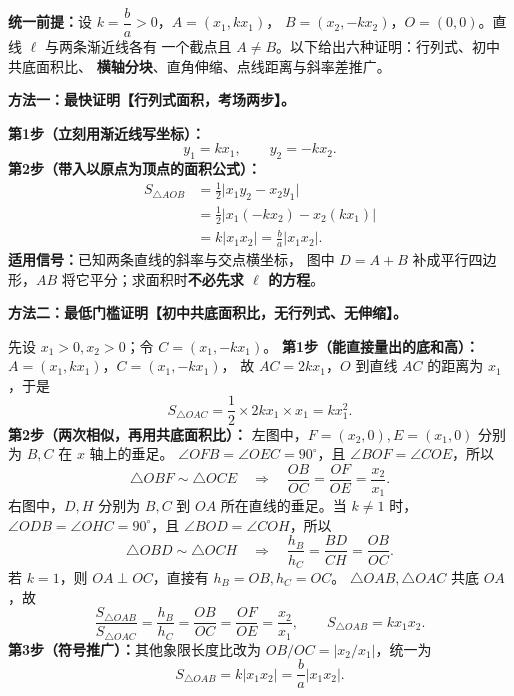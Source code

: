 \clearpage
\begin{proofbox}
\textbf{统一前提：}设 $k=\dfrac ba>0$，$A=(x_1,kx_1)$，
$B=(x_2,-kx_2)$，$O=(0,0)$。直线 $\ell$ 与两条渐近线各有
一个截点且 $A\ne B$。以下给出六种证明：行列式、初中共底面积比、
\textbf{横轴分块}、直角伸缩、点线距离与斜率差推广。

\medskip
\textbf{方法一：最快证明【行列式面积，考场两步】。}
\begin{center}\end{center}


\textbf{第1步（立刻用渐近线写坐标）：}
\[
 y_1=kx_1,\qquad y_2=-kx_2.
\]
\textbf{第2步（带入以原点为顶点的面积公式）：}
\[
\begin{aligned}
S_{\triangle AOB}
&=\frac12\big|x_1y_2-x_2y_1\big|\\
&=\frac12\big|x_1(-kx_2)-x_2(kx_1)\big|\\
&=\boxed{k|x_1x_2|=\frac ba|x_1x_2|}.
\end{aligned}
\]
\textbf{适用信号：}已知两条直线的斜率与交点横坐标，
图中 $D=A+B$ 补成平行四边形，$AB$ 将它平分；求面积时\textbf{不必先求 $\ell$ 的方程}。

\medskip

\end{proofbox}
\clearpage
\begin{proofbox}
\textbf{方法二：最低门槛证明【初中共底面积比，无行列式、无伸缩】。}
\begin{center}\end{center}


先设 $x_1>0,x_2>0$；令 $C=(x_1,-kx_1)$。
\textbf{第1步（能直接量出的底和高）：}
$A=(x_1,kx_1)$，$C=(x_1,-kx_1)$，
故 $AC=2kx_1$，$O$ 到直线 $AC$ 的距离为 $x_1$，于是
\[
S_{\triangle OAC}=\frac12\times 2kx_1\times x_1=kx_1^2.
\]
\textbf{第2步（两次相似，再用共底面积比）：}
左图中，$F=(x_2,0),E=(x_1,0)$ 分别为 $B,C$ 在 $x$ 轴上的垂足。
$\angle OFB=\angle OEC=90^\circ$，且 $\angle BOF=\angle COE$，所以
\[
\triangle OBF\sim\triangle OCE
\quad\Longrightarrow\quad
\frac{OB}{OC}=\frac{OF}{OE}=\frac{x_2}{x_1}.
\]
右图中，$D,H$ 分别为 $B,C$ 到 $OA$ 所在直线的垂足。当 $k\ne1$ 时，
$\angle ODB=\angle OHC=90^\circ$，且 $\angle BOD=\angle COH$，所以
\[
\triangle OBD\sim\triangle OCH
\quad\Longrightarrow\quad
\frac{h_B}{h_C}=\frac{BD}{CH}=\frac{OB}{OC}.
\]
若 $k=1$，则 $OA\perp OC$，直接有 $h_B=OB,h_C=OC$。
$\triangle OAB,\triangle OAC$ 共底 $OA$，故
\[
\frac{S_{\triangle OAB}}{S_{\triangle OAC}}
=\frac{h_B}{h_C}=\frac{OB}{OC}=\frac{OF}{OE}=\frac{x_2}{x_1},
\qquad S_{\triangle OAB}=kx_1x_2.
\]
\textbf{第3步（符号推广）：}其他象限长度比改为 $OB/OC=|x_2/x_1|$，统一为
\[
\boxed{S_{\triangle OAB}=k|x_1x_2|=\frac ba|x_1x_2|}.
\]
\end{proofbox}

